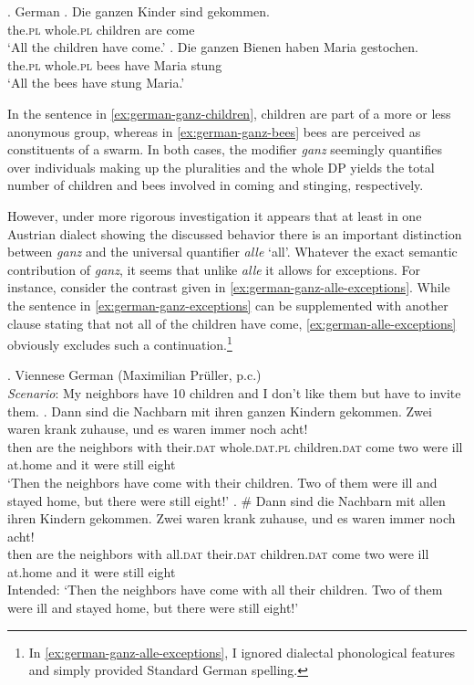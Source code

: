 \ex. German \citep[p. 125; adapted]{moltmann1997parts}\label{ex:german-ganz}
\ag. Die ganzen Kinder sind gekommen.\label{ex:german-ganz-children}\\
the\textsc{.pl} whole\textsc{.pl} children are come\\
`All the children have come.'
\bg. Die ganzen Bienen haben Maria gestochen.\label{ex:german-ganz-bees}\\
the\textsc{.pl} whole\textsc{.pl} bees have Maria stung\\
`All the bees have stung Maria.'

In the sentence in \ref{ex:german-ganz-children}, children are part of a more or less anonymous group, whereas in \ref{ex:german-ganz-bees} bees are perceived as constituents of a swarm. In both cases, the modifier \textit{ganz} seemingly quantifies over individuals making up the pluralities and the whole DP yields the total number of children and bees involved in coming and stinging, respectively.

However, under more rigorous investigation it appears that at least in one Austrian dialect showing the discussed behavior there is an important distinction between \textit{ganz} and the universal quantifier \textit{alle} `all'. Whatever the exact semantic contribution of \textit{ganz}, it seems that unlike \textit{alle} it allows for exceptions. For instance, consider the contrast given in \ref{ex:german-ganz-alle-exceptions}. While the sentence in \ref{ex:german-ganz-exceptions} can be supplemented with another clause stating that not all of the children have come, \ref{ex:german-alle-exceptions} obviously excludes such a continuation.\footnote{In \ref{ex:german-ganz-alle-exceptions}, I ignored dialectal phonological features and simply provided Standard German spelling.}

\ex. Viennese German (Maximilian Prüller, p.c.)\label{ex:german-ganz-alle-exceptions}\\
\textit{Scenario}: My neighbors have 10 children and I don't like them but have to invite them.
\ag. Dann sind die Nachbarn mit ihren ganzen Kindern gekommen. Zwei waren krank zuhause, und es waren {immer noch} acht!\label{ex:german-ganz-exceptions}\\
then are the neighbors with their\textsc{.dat} whole\textsc{.dat.pl} children\textsc{.dat} come two were ill at.home and it were still eight\\
`Then the neighbors have come with their children. Two of them were ill and stayed home, but there were still eight!'
\bg. \# Dann sind die Nachbarn mit allen ihren Kindern gekommen. Zwei waren krank zuhause, und es waren {immer noch} acht!\label{ex:german-alle-exceptions}\\
then are the neighbors with all\textsc{.dat} their\textsc{.dat} children\textsc{.dat} come two were ill at.home and it were still eight\\
Intended: `Then the neighbors have come with all their children. Two of them were ill and stayed home, but there were still eight!'


